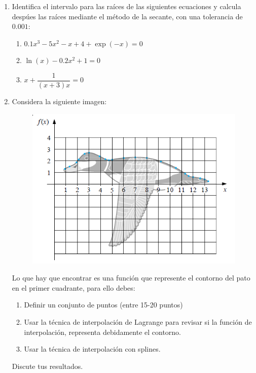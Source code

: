 \documentclass[11pt]{article}
\begin{document}
\begin{enumerate}
	\item Identifica el intervalo para las raíces de las siguientes ecuaciones y calcula despúes las raíces mediante el método de la secante, con una tolerancia de $0.001$:
	\begin{enumerate}
		\item $0.1 x^{3} - 5 x^{2} - x + 4 + \exp(-x) = 0 $
		\item $\ln(x) -0.2 x^{2} + 1 = 0$
		\item $x + \dfrac{1}{(x+3)x}= 0$
	\end{enumerate}
\item Considera la siguiente imagen:
\begin{figure}[H]
	\centering
	\includegraphics[scale=0.75]{Imagenes/ContornoPato.png} 
\end{figure}
Lo que hay que encontrar es una función que represente el contorno del pato en el primer cuadrante, para ello debes:
\begin{enumerate}
\item Definir un conjunto de puntos (entre 15-20 puntos)
\item Usar la técnica de interpolación de Lagrange para revisar si la función de interpolación, representa debidamente el contorno.
\item Usar la técnica de interpolación con splines.
\end{enumerate}
Discute tus resultados.
\end{enumerate}
\end{document}
